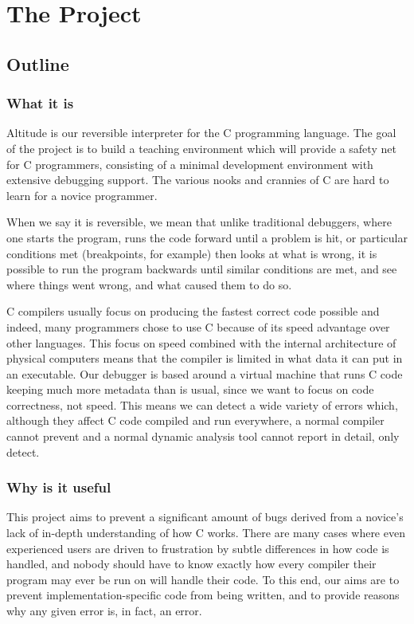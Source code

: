 \documentclass[10pt,a4paper]{report}
\begin{document}
\tableofcontents

\chapter{The Project}

\section{Outline}
\subsection{What it is}
Altitude is our reversible interpreter for the C programming language. The goal of the project is to build a teaching environment which will provide a safety net for C programmers, consisting of a minimal development environment with extensive debugging support. The various nooks and crannies of C are hard to learn for a novice programmer.

When we say it is reversible, we mean that unlike traditional debuggers, where one starts the program, runs the code forward until a problem is hit, or particular conditions met (breakpoints, for example) then looks at what is wrong, it is possible to run the program backwards until similar conditions are met, and see where things went wrong, and what caused them to do so.

C compilers usually focus on producing the fastest correct code possible and indeed, many programmers chose to use C because of its speed advantage over other languages. This focus on speed combined with the internal architecture of physical computers means that the compiler is limited in what data it can put in an executable. Our debugger is based around a virtual machine that runs C code keeping much more metadata than is usual, since we want to focus on code correctness, not speed. This means we can detect a wide variety of errors which, although they affect C code compiled and run everywhere, a normal compiler cannot prevent and a normal dynamic analysis tool cannot report in detail, only detect.

\subsection{Why is it useful}
This project aims to prevent a significant amount of bugs derived from a novice's lack of in-depth understanding of how C works. There are many cases where even experienced users are driven to frustration by subtle differences in how code is handled, and nobody should have to know exactly how every compiler their program may ever be run on will handle their code. To this end, our aims are to prevent implementation-specific code from being written, and to provide reasons why any given error is, in fact, an error.
\end{document}
